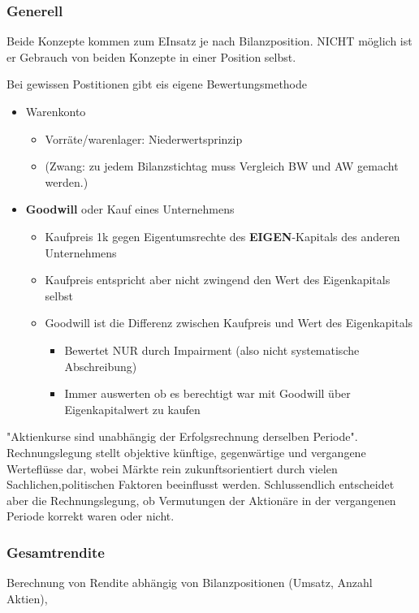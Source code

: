 \subsubsection{Generell}

Beide Konzepte kommen zum EInsatz je nach Bilanzposition. NICHT möglich ist er Gebrauch von beiden Konzepte in einer Position selbst.

Bei gewissen Postitionen gibt eis eigene Bewertungsmethode 
\begin{itemize}
    \item Warenkonto
    \begin{itemize}
        \item Vorräte/warenlager: Niederwertsprinzip
        \item (Zwang: zu jedem Bilanzstichtag muss Vergleich BW und AW gemacht werden.)
    \end{itemize}
    \item \textbf{Goodwill} oder Kauf eines Unternehmens
    \begin{itemize}
        \item Kaufpreis 1k gegen Eigentumsrechte des \textbf{EIGEN}-Kapitals des anderen Unternehmens
        \item Kaufpreis entspricht aber nicht zwingend den Wert des Eigenkapitals selbst
        \item Goodwill ist die Differenz zwischen Kaufpreis und Wert des Eigenkapitals
        \begin{itemize}
            \item Bewertet NUR durch Impairment (also nicht systematische Abschreibung)
            \item Immer auswerten ob es berechtigt war mit Goodwill über Eigenkapitalwert zu kaufen
        \end{itemize}
    \end{itemize}
\end{itemize}

"Aktienkurse sind unabhängig der Erfolgsrechnung derselben Periode". Rechnungslegung stellt objektive künftige, gegenwärtige und vergangene Werteflüsse dar, wobei Märkte rein zukunftsorientiert durch vielen Sachlichen,politischen Faktoren beeinflusst werden.
Schlussendlich entscheidet aber die Rechnungslegung, ob Vermutungen der Aktionäre in der vergangenen Periode korrekt waren oder nicht.

\subsubsection{Gesamtrendite}
Berechnung von Rendite abhängig von Bilanzpositionen (Umsatz, Anzahl Aktien),  
